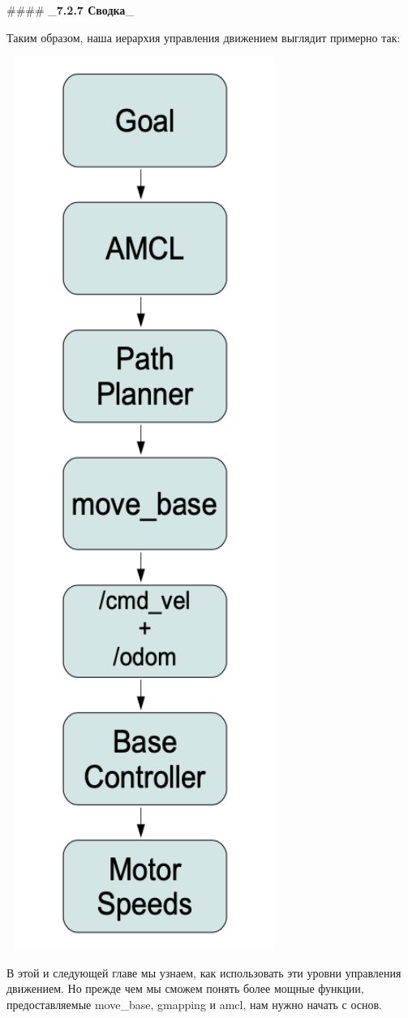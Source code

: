 #### _\textbf{7.2.7 Сводка}_

 Таким образом, наша иерархия управления движением выглядит примерно так:

\includegraphics[width=9cm]{.gitbook/assets/snimok-ekrana-2020-05-30-v-13.32.37.png}

В этой и следующей главе мы узнаем, как использовать эти уровни управления движением. Но прежде чем мы сможем понять более мощные функции, предоставляемые move\_base, gmapping и amcl, нам нужно начать с основ.

